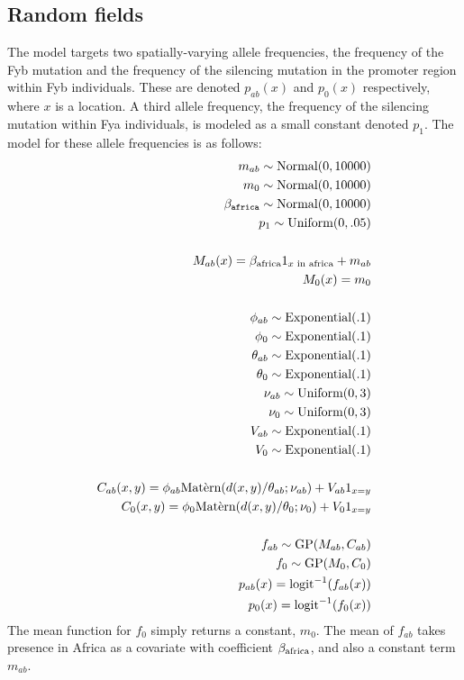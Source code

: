 \documentclass[a4paper]{article}
\begin{document}
\subsection{Random fields}
The model targets two spatially-varying allele frequencies, the frequency of the Fyb mutation and the frequency of the silencing mutation in the promoter region within Fyb individuals. These are denoted $p_{ab}(x)$ and $p_0(x)$ respectively, where $x$ is a location. A third allele frequency, the frequency of the silencing mutation within Fya individuals, is modeled as a small constant denoted $p_1$. The model for these allele frequencies is as follows:
\begin{eqnarray*}
    m_{ab} \sim \textup{Normal}(0,10000) \\
    m_0 \sim \textup{Normal}(0,10000)\\
    \beta_{\mathtt{africa}} \sim \textup{Normal}(0,10000)\\
    p_1\sim\textup{Uniform}(0,.05)\\
    \\
    M_{ab}(x) = \beta_{\textup{africa}} 1_{x\textup{\ in\ africa}} + m_{ab}\\
    M_0(x) = m_0\\
    \\
    \phi_{ab}\sim\textup{Exponential}(.1)\\
    \phi_{0}\sim\textup{Exponential}(.1)\\
    \theta_{ab}\sim\textup{Exponential}(.1)\\
    \theta_{0}\sim\textup{Exponential}(.1)\\
    \nu_{ab}\sim\textup{Uniform}(0,3)\\
    \nu_{0}\sim\textup{Uniform}(0,3)\\
    V_{ab}\sim\textup{Exponential}(.1)\\
    V_0\sim\textup{Exponential}(.1)\\
    \\
    C_{ab}(x,y) = \phi_{ab}\textup{Mat\`ern}(d(x,y)/\theta_{ab};\nu_{ab})+V_{ab}1_{x=y}\\
    C_{0}(x,y) = \phi_{0}\textup{Mat\`ern}(d(x,y)/\theta_{0};\nu_{0})+V_{0}1_{x=y}\\
    \\
    f_{ab}\sim\textup{GP}(M_{ab},C_{ab})\\
    f_{0}\sim\textup{GP}(M_{0},C_{0})\\
    p_{ab}(x)=\textup{logit}^{-1}(f_{ab}(x)) \\
    p_{0}(x)=\textup{logit}^{-1}(f_{0}(x))     
\end{eqnarray*}
The mean function for $f_0$ simply returns a constant, $m_0$. The mean of $f_{ab}$ takes presence in Africa as a covariate with coefficient $\beta_{\textup{africa}}$, and also a constant term $m_{ab}$. 
\end{document}
